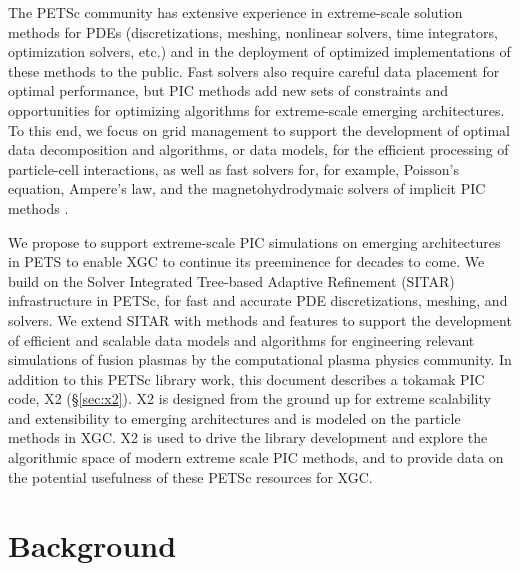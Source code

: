 \documentclass[review]{siamart}
\begin{document}
The PETSc community has extensive experience in extreme-scale solution methods for PDEs (discretizations, meshing, nonlinear solvers, time integrators, optimization solvers, etc.) and in the deployment of optimized implementations of these methods to the public.
Fast solvers also require careful data placement for optimal performance, but PIC methods add new sets of constraints and opportunities for optimizing algorithms for extreme-scale emerging architectures.
To this end, we focus on grid management to support the development of optimal data decomposition and algorithms, or data models,  for the efficient processing of particle-cell interactions, as well as fast solvers for, for example, Poisson's equation, Ampere's law, and the magnetohydrodymaic  solvers of implicit PIC methods \cite{DBLP:journals/cphysics/ChenC15,Adams-10a}.

We propose to support extreme-scale PIC simulations on emerging architectures in PETS to enable XGC to continue its preeminence for decades to come.
We build on the Solver Integrated Tree-based Adaptive Refinement (SITAR) infrastructure in PETSc, for fast and accurate PDE discretizations, meshing, and solvers.
We extend SITAR with methods and features to support the development of efficient and scalable data models and algorithms for engineering relevant simulations of fusion plasmas by the computational plasma physics community.
In addition to this PETSc library work, this document describes a tokamak PIC code, X2 (\S\ref{sec:x2}).
X2 is designed from the ground up for extreme scalability and extensibility to emerging architectures and is modeled on the particle methods in XGC.
X2 is used to drive the library development and explore the algorithmic space of modern extreme scale PIC methods, and to provide data on the potential usefulness of these PETSc resources for XGC.

\section{Background}
\end{document}
